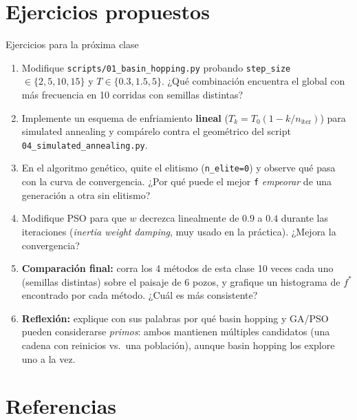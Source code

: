 \documentclass[aspectratio=169,10pt]{beamer}
\begin{document}
\section{Ejercicios propuestos}

\begin{frame}{Ejercicios para la próxima clase}
  \footnotesize
  \begin{enumerate}
    \item Modifique \texttt{scripts/01\_basin\_hopping.py} probando
      \texttt{step\_size} $\in\{2,5,10,15\}$ y $T\in\{0.3,1.5,5\}$.
      ¿Qué combinación encuentra el global con más frecuencia en 10
      corridas con semillas distintas?
    \item Implemente un esquema de enfriamiento \textbf{lineal}
      ($T_k=T_0(1-k/n_{\text{iter}})$) para simulated annealing y
      compárelo contra el geométrico del script
      \texttt{04\_simulated\_annealing.py}.
    \item En el algoritmo genético, quite el elitismo
      (\texttt{n\_elite=0}) y observe qué pasa con la curva de
      convergencia. ¿Por qué puede el mejor \texttt{f} \emph{empeorar}
      de una generación a otra sin elitismo?
    \item Modifique PSO para que $w$ decrezca linealmente de $0.9$ a
      $0.4$ durante las iteraciones (\emph{inertia weight damping}, muy
      usado en la práctica). ¿Mejora la convergencia?
    \item \textbf{Comparación final:} corra los 4 métodos de esta clase
      10 veces cada uno (semillas distintas) sobre el paisaje de 6
      pozos, y grafique un histograma de $f^*$ encontrado por cada
      método. ¿Cuál es más consistente?
    \item \textbf{Reflexión:} explique con sus palabras por qué basin
      hopping y GA/PSO pueden considerarse \emph{primos}: ambos mantienen
      múltiples candidatos (una cadena con reinicios vs.\ una
      población), aunque basin hopping los explore uno a la vez.
  \end{enumerate}
\end{frame}

\section{Referencias}
\end{document}
